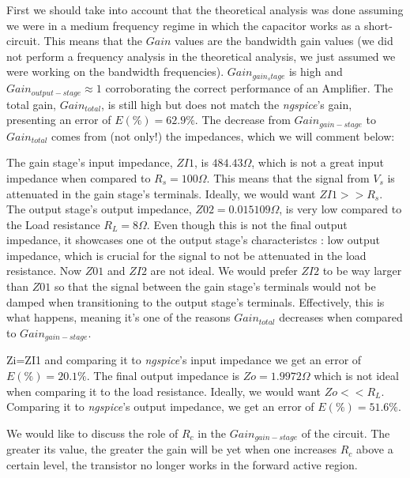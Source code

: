 First we should take into account that the theoretical analysis was done assuming we were in a medium frequency regime in which
the capacitor works as a short-circuit.
This means that the $Gain$ values are the bandwidth gain values (we did not perform a frequency analysis in the theoretical analysis,
we just assumed we were working on the bandwidth frequencies).
$Gain_{gain_stage}$ is high and $Gain_{output-stage} \approx 1$ corroborating the correct performance of an Amplifier. The total gain, $Gain_{total}$, is still high
but does not match the \textit{ngspice}'s gain, presenting an error of $E(\%)=62.9\% $. The decrease from $Gain_{gain-stage}$ to $Gain_{total}$ comes from (not only!) the impedances,
which we will comment below:\par

The gain stage's input impedance, $ZI1$, is $484.43\Omega$, which is not a great input impedance when compared to $R_s=100\Omega$. This means that the signal from $V_s$ is
attenuated in the gain stage's terminals. Ideally, we would want $ZI1>>R_s$. The output stage's output impedance, $Z02=0.015109 \Omega$, is very low compared to the Load resistance $R_L=8\Omega$.
Even though this is not the final output impedance, it showcases one ot the output stage's characteristcs : low output impedance, which is crucial for the signal to not be attenuated in the load resistance.
Now $Z01$ and $ZI2$ are not ideal. We would prefer $ZI2$ to be way larger than $Z01$ so that the signal between the gain stage's terminals would not be damped when transitioning to the output stage's terminals.
Effectively, this is what happens, meaning it's one of the reasons $Gain_{total}$ decreases when compared to $Gain_{gain-stage}$.\par
Zi=ZI1 and comparing it to \textit{ngspice}'s input impedance we get an error of $E(\%)=20.1\%$. The final output impedance is $Zo=1.9972\Omega$ which is not ideal when comparing it to the load resistance. Ideally,
we would want $Zo<<R_L$. Comparing it to \textit{ngspice}'s output impedance, we get an error of $E(\%)=51.6\%$.
\par
We would like to discuss the role of $R_c$ in the $Gain_{gain-stage}$ of the circuit. The greater its value, the greater the gain will be yet when one increases $R_c$ above a certain level, the transistor no longer works in
the forward active region.
